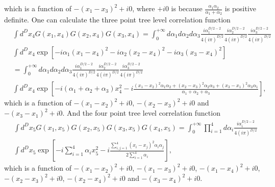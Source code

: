 \documentclass[a4paper,11pt]{article}
\begin{document}
which is a function of $-(x_1-x_3)^2+i0$, where $+i0$ is because $\frac{\alpha_1 \alpha_2}{\alpha_1+\alpha_2}$ is positive definite. One can calculate the three point tree level correlation function
\begin{align}
&\int d^{D} x_4 G(x_1,x_4) G(x_2,x_4) G(x_3,x_4) = \int_{0}^{+\infty} d \alpha_1 d \alpha_2 d \alpha_3 
\frac{i \alpha_1^{D/2-2}}{4 (i \pi)^{D/2}}\frac{i \alpha_2^{D/2-2}}{4 (i \pi)^{D/2}}\frac{i \alpha_3^{D/2-2}}{4 (i \pi)^{D/2}} 
\nonumber\\
&\int d^{D} x_4 \exp\left[-i \alpha_1 (x_1-x_4)^2 -i \alpha_2 (x_2-x_4)^2-i \alpha_3 (x_3-x_4)^2\right] \nonumber\\
&= \int_{0}^{+\infty} d \alpha_1 d \alpha_2 d \alpha_3 
\frac{i \alpha_1^{D/2-2}}{4 (i \pi)^{D/2}}\frac{i \alpha_2^{D/2-2}}{4 (i \pi)^{D/2}}\frac{i \alpha_3^{D/2-2}}{4 (i \pi)^{D/2}} 
\nonumber\\
&\int d^{D} x_4 \exp\left[-i (\alpha_1+\alpha_2+\alpha_3)x_4^2 -i \frac{(x_1-x_2)^2 \alpha_1 \alpha_2 + (x_2-x_3)^2 \alpha_2 \alpha_3 + (x_3-x_1)^2 \alpha_3 \alpha_1}{\alpha_1+\alpha_2+\alpha_3} \right],
\end{align}
which is a function of $-(x_1-x_2)^2+i0$, $-(x_2-x_3)^2+i0$ and $-(x_3-x_1)^2+i0$. And the four point tree level correlation function
\begin{align}
&\int d^{D} x_5 G(x_1,x_5) G(x_2,x_5) G(x_3,x_5) G(x_4,x_5) = \int_{0}^{+\infty} \prod_{i=1}^{4} d \alpha_i \frac{i \alpha_i^{D/2-2}}{4 (i \pi)^{D/2}}\nonumber\\
&\int d^{D}x_5 \exp \left[-i \sum_{i=1}^4\alpha_i x_5^2 - i \frac{\sum_{i,j=1}^{4}(x_i - x_j)^2 \alpha_i \alpha_j}{2\sum_{i=1}^4\alpha_i}\right],
\end{align}
which is a function of $-(x_1-x_2)^2+i0$, $-(x_1-x_3)^2+i0$, $-(x_1-x_4)^2+i0$, $-(x_2-x_3)^2+i0$, $-(x_2-x_4)^2+i0$ and $-(x_3-x_4)^2+i0$. 
\fi
\end{document}
